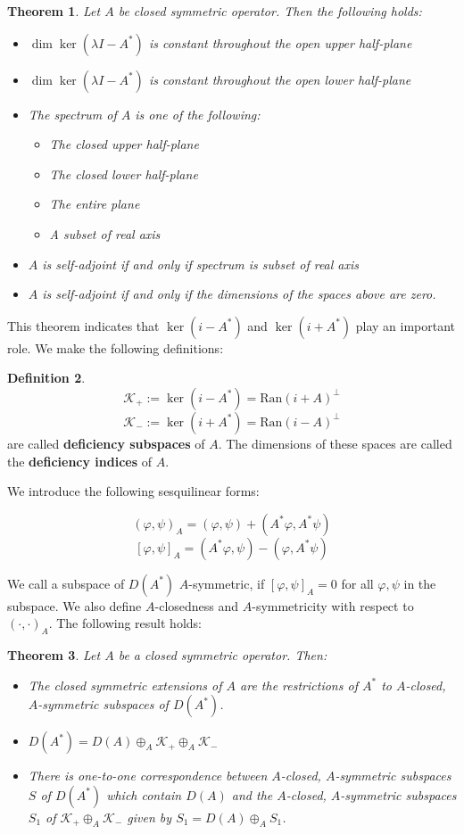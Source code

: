 \documentclass[11pt, a4paper, german]{article}
\theoremstyle{plain}
\newtheorem{theorem}{Theorem}
\theoremstyle{definition}
\newtheorem{definition}[theorem]{Definition}
\theoremstyle{remark}
\numberwithin{equation}{section}
\numberwithin{theorem}{section}
\begin{document}
\begin{theorem}
Let $A$ be closed symmetric operator. Then the following holds:
\begin{itemize}
\item $\dim \ker (\lambda I - A^*)$ is constant throughout the open upper half-plane
\item $\dim \ker (\lambda I - A^*)$ is constant throughout the open lower half-plane
\item The spectrum of $A$ is one of the following: 
	\begin{itemize}
	\item The closed upper half-plane
	\item The closed lower half-plane
	\item The entire plane
	\item A subset of real axis
	\end{itemize}
\item $A$ is self-adjoint if and only if spectrum is subset of real axis
\item $A$ is self-adjoint if and only if the dimensions of the spaces above are zero.
\end{itemize}
\end{theorem}

This theorem indicates that $\ker (i - A^*)$ and $\ker (i + A^*)$ play an important role. We make the following definitions:

\begin{definition}
$$\mathcal{K}_+:=\ker (i-A^*) = \text{Ran}(i+A)^{\perp}$$
$$\mathcal{K}_-:=\ker (i+A^*) = \text{Ran}(i-A)^{\perp}$$
are called \textbf{deficiency subspaces} of $A$. The dimensions of these spaces are called the \textbf{deficiency indices} of $A$.

\end{definition}

We introduce the following sesquilinear forms:

$$(\varphi, \psi)_A = (\varphi, \psi) + (A^*\varphi, A^*\psi)$$
$$[\varphi, \psi]_A = (A^*\varphi, \psi) - (\varphi, A^*\psi)$$

We call a subspace of $D(A^*)$ $A$-symmetric, if $[\varphi, \psi]_A = 0$ for all $\varphi, \psi$ in the subspace. We also define $A$-closedness and $A$-symmetricity with respect to $(\cdot, \cdot)_A$. The following result holds:

\begin{theorem}\label{von-neumann-dec}
Let $A$ be a closed symmetric operator. Then:
\begin{itemize}
\item The closed symmetric extensions of $A$ are the restrictions of $A^*$ to $A$-closed, $A$-symmetric subspaces of $D(A^*)$.
\item $D(A^*) = D(A)\oplus_A \mathcal{K}_+ \oplus_A \mathcal{K}_-$
\item There is one-to-one correspondence between $A$-closed, $A$-symmetric subspaces $S$ of $D(A^*)$ which contain $D(A)$ and the $A$-closed, $A$-symmetric subspaces $S_1$ of $\mathcal{K}_+\oplus_A\mathcal{K}_-$ given by $S_1 = D(A) \oplus_A S_1$.
\end{itemize}
\end{theorem}
\end{document}
